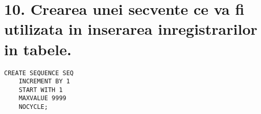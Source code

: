 

\section*{10. Crearea unei secvente ce va fi utilizata in inserarea inregistrarilor in tabele.}


\vspace{1cm}

\begin{lstlisting}
CREATE SEQUENCE SEQ
    INCREMENT BY 1
    START WITH 1
    MAXVALUE 9999
    NOCYCLE;
    
\end{lstlisting}
